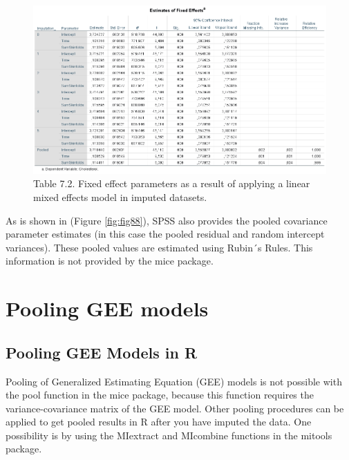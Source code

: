 \documentclass[]{book}
\theoremstyle{definition}
\theoremstyle{definition}
\theoremstyle{definition}
\theoremstyle{remark}
\begin{document}
\begin{figure}

{\centering \includegraphics[width=0.9\linewidth]{images/table7.3} 

}

\caption{Table 7.2. Fixed effect parameters as a result of applying a linear mixed effects model in imputed datasets.}\label{fig:fig89}
\end{figure}

As is shown in (Figure \ref{fig:fig88}), SPSS also provides the pooled
covariance parameter estimates (in this case the pooled residual and
random intercept variances). These pooled values are estimated using
Rubin´s Rules. This information is not provided by the mice package.

\section{Pooling GEE models}\label{pooling-gee-models}

\subsection{Pooling GEE Models in R}\label{pooling-gee-models-in-r}

Pooling of Generalized Estimating Equation (GEE) models is not possible
with the pool function in the mice package, because this function
requires the variance-covariance matrix of the GEE model. Other pooling
procedures can be applied to get pooled results in R after you have
imputed the data. One possibility is by using the MIextract and
MIcombine functions in the mitools package.
\end{document}
